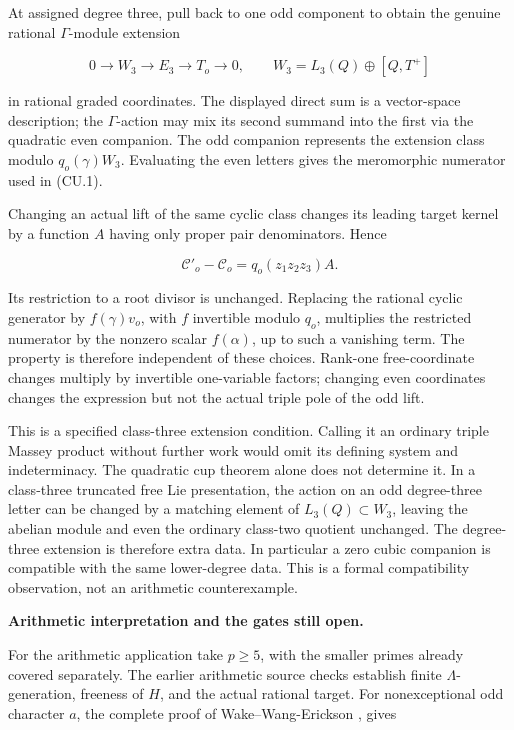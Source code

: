 At assigned degree three, pull back to one odd component to obtain the genuine rational \(\Gamma\)-module extension

\[
0\longrightarrow W_3
\longrightarrow E_3
\longrightarrow T_o
\longrightarrow0,
\qquad
W_3=L_3(Q)\oplus[Q,T^+]
\]

in rational graded coordinates. The displayed direct sum is a vector-space description; the \(\Gamma\)-action may mix its second summand into the first via the quadratic even companion. The odd companion represents the extension class modulo \(q_o(\gamma)W_3\). Evaluating the even letters gives the meromorphic numerator used in (CU.1).

Changing an actual lift of the same cyclic class changes its leading target kernel by a function \(A\) having only proper pair denominators. Hence

\[
\mathcal C'_o-\mathcal C_o=q_o(z_1z_2z_3)A.
\]

Its restriction to a root divisor is unchanged. Replacing the rational cyclic generator by \(f(\gamma)v_o\), with \(f\) invertible modulo \(q_o\), multiplies the restricted numerator by the nonzero scalar \(f(\alpha)\), up to such a vanishing term. The property is therefore independent of these choices. Rank-one free-coordinate changes multiply by invertible one-variable factors; changing even coordinates changes the expression but not the actual triple pole of the odd lift.

This is a specified class-three extension condition. Calling it an ordinary triple Massey product without further work would omit its defining system and indeterminacy. The quadratic cup theorem alone does not determine it. In a class-three truncated free Lie presentation, the action on an odd degree-three letter can be changed by a matching element of \(L_3(Q)\subset W_3\), leaving the abelian module and even the ordinary class-two quotient unchanged. The degree-three extension is therefore extra data. In particular a zero cubic companion is compatible with the same lower-degree data. This is a formal compatibility observation, not an arithmetic counterexample.

\par\medskip\noindent\textbf{Arithmetic interpretation and the gates still open.}

For the arithmetic application take \(p\ge5\), with the smaller primes already covered separately. The earlier arithmetic source checks establish finite \(\Lambda\)-generation, freeness of \(H\), and the actual rational target. For nonexceptional odd character \(a\), the complete proof of Wake--Wang-Erickson \cite[Proposition~2.2.6 and proof, pp.~3--4]{WakeWangErickson2017}, gives

